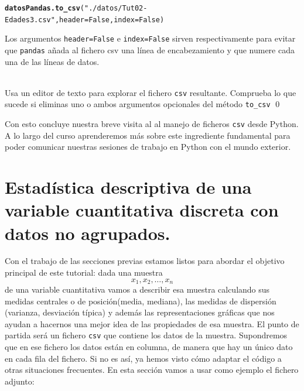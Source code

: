 \documentclass[10pt,a4paper]{article}\usepackage[]{graphicx}\usepackage[]{color}
\makeatletter
\newcommand{\hlstr}[1]{\textcolor[rgb]{0.192,0.494,0.8}{#1}}%
\newcommand{\hlstd}[1]{\textcolor[rgb]{0.345,0.345,0.345}{#1}}%
\newcommand{\hlkwc}[1]{\textcolor[rgb]{0.333,0.667,0.333}{#1}}%
\newcommand{\hlkwd}[1]{\textcolor[rgb]{0.737,0.353,0.396}{\textbf{#1}}}%
\newenvironment{kframe}{%
 \def\at@end@of@kframe{}%
 \ifinner\ifhmode%
  \def\at@end@of@kframe{\end{minipage}}%
  \begin{minipage}{\columnwidth}%
 \fi\fi%
 \def\FrameCommand##1{\hskip\@totalleftmargin \hskip-\fboxsep
 \colorbox{shadecolor}{##1}\hskip-\fboxsep
     \hskip-\linewidth \hskip-\@totalleftmargin \hskip\columnwidth}%
 \MakeFramed {\advance\hsize-\width
   \@totalleftmargin\z@ \linewidth\hsize
   \@setminipage}}%
 {\par\unskip\endMakeFramed%
 \at@end@of@kframe}
\newenvironment{knitrout}{}{} %
\newcounter {cont01}
\makeatother
\begin{document}
\begin{knitrout}
\color{fgcolor}\begin{kframe}
\begin{alltt}
\hlkwd{datosPandas.to_csv}\hlstd{(}\hlstr{"./datos/Tut02-Edades3.csv"}\hlstd{,} \hlkwc{header}\hlstd{=False,} \hlkwc{index}\hlstd{=False)}
\end{alltt}
\end{kframe}
\end{knitrout}
Los argumentos {\tt header=False} e {\tt index=False} sirven respectivamente para evitar que {\tt pandas} añada al fichero csv una línea de encabezamiento y que numere cada una de las líneas de datos.
\begin{ejercicio}
\label{tut02:ejercicio22}
\quad\\
Usa un editor de texto para explorar el fichero {\tt csv} resultante. Comprueba lo que sucede si eliminas uno o ambos argumentos opcionales del método  \verb#to_csv#
\qed
\end{ejercicio}
Con esto concluye nuestra breve visita al al manejo de ficheros {\tt csv} desde Python. A lo largo del curso aprenderemos más sobre este ingrediente fundamental para poder comunicar nuestras sesiones de trabajo en Python con el mundo exterior.

\section{Estadística descriptiva de una variable cuantitativa discreta con datos no agrupados.}
\label{tut02:sec:estadisticaDescriptiva}

Con el trabajo de las secciones previas estamos listos para abordar el objetivo principal de este tutorial: dada una muestra
\[
x_1, x_2, \ldots, x_n
\]
de una variable cuantitativa vamos a describir esa muestra calculando sus medidas centrales o de posición(media, mediana), las medidas de dispersión (varianza, desviación típica) y además las representaciones gráficas que nos ayudan a hacernos una mejor idea de las propiedades de esa muestra.
El punto de partida será un fichero {\tt csv} que contiene los datos de la muestra. Supondremos que en ese fichero los datos están en columna, de manera que hay un único dato en cada fila del fichero. Si no es así, ya hemos visto cómo adaptar el código a otras situaciones frecuentes. En esta sección vamos a usar como ejemplo el fichero adjunto:
\begin{center}
\end{center}
\end{document}
